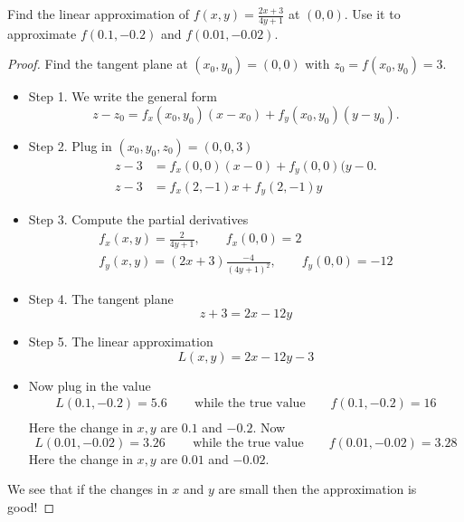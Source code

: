 \begin{example} Find the linear approximation of $f(x,y) = \frac{2x+3}{4y+1}$ at $(0,0)$. Use it to approximate $f(0.1, -0.2)$ and $f(0.01, -0.02)$.
\end{example}
\begin{proof} Find the tangent plane at $(x_0,y_0) = (0,0)$ with $z_0 = f(x_0,y_0) = 3$. 
    \begin{itemize}
    \item Step 1. We write the general form
    \begin{equation*}
        z - z_0 = f_x(x_0,y_0)(x-x_0) + f_y(x_0,y_0)(y-y_0).
    \end{equation*}
    \item Step 2. Plug in $(x_0,y_0,z_0) = (0,0,3)$
    \begin{align*}
         z - 3 &= f_x(0,0)(x-0) + f_y(0,0)(y-0.  \\
         z - 3 &= f_x(2,-1)x + f_y(2,-1)y
    \end{align*}
    \item Step 3. Compute the partial derivatives
    \begin{align*}
        f_x(x,y) = \frac{2}{4y+1}, \qquad f_x(0,0) = 2\\
        f_y(x,y) = (2x+3)\frac{-4}{(4y+1)^2}, \qquad f_y(0,0) = -12
    \end{align*}
    \item Step 4. The tangent plane
    \begin{equation*}
        z + 3 = 2x -12 y
    \end{equation*}
    \item Step 5. The linear approximation
    \begin{equation*}
        L(x,y) = 2x -12 y - 3
    \end{equation*}
    \item Now plug in the value
    \begin{align*}
         L(0.1, -0.2)  = 5.6\, \qquad \text{while the true value}\qquad f(0.1, -0.2) = 16 \\
    \end{align*}
    Here the change in $x,y$ are $0.1$ and $-0.2$.  Now
    \begin{equation*}
         L(0.01, -0.02)  = 3.26\, \qquad \text{while the true value}\qquad f(0.01, -0.02) = 3.28
    \end{equation*}
    Here the change in $x,y$ are $0.01$ and $-0.02$. 
\end{itemize}
We see that if the changes in $x$ and $y$ are small then the approximation is good!    
\end{proof}

